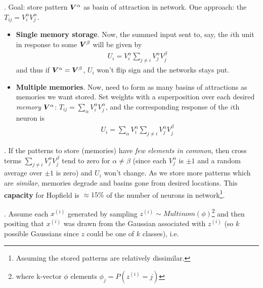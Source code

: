 \documentclass[12pt]{article}
\begin{document}
\p {}. Goal: store pattern $\bm{V}_{}^\alpha$ as basin of attraction in network. One approach: the  $T_{ij} = V_i^\alpha V_j^\alpha$.
\begin{itemize}[$\rightarrow$]
	\item \textbf{Single memory storage}. Now, the summed input sent to, say, the $i$th unit in response to some  $\bm{V}_{}^\beta$ will be given by 
	\begin{align}
		U_i = V_i^\alpha \sum_{j \ne i} V_j^\alpha V_j^\beta 
	\end{align}
	and thus if  $\bm{V}_{}^\alpha = \bm{V}_{}^\beta$, $U_i$ won't flip sign and the networks stays put.
	
	\item \textbf{Multiple memories}. Now, need to form as many basins of attractions as memories we want stored. Set weights with a superposition over each desired \textit{memory} $\bm{V}_{}^\alpha$: $T_{ij} = \sum_\alpha V_i^\alpha V_j^\alpha$, and the corresponding response of the $i$th neuron is
	\begin{align}
		U_i = \sum_\alpha V_i^\alpha \sum_{j \ne i} V_j^\alpha V_j^\beta \label{18}
	\end{align}
\end{itemize}

\p {}. If the patterns to store (memories) have \textit{few elements in common}, then cross terms $\sum_{j\ne i}  V_j^\alpha V_j^\beta$ tend to zero for $\alpha \ne \beta$ (since each $V_j^\alpha$ is $\pm 1$ and a random average over $\pm 1$ is zero) and $U_i$ won't change. As we store more patterns which are \textit{similar}, memories degrade and basins gone from desired locations. This \textbf{capacity} for Hopfield is $\approx 15\%$ of the number of neurons in network\footnote{Assuming the stored patterns are relatively dissimilar.}.






\p {}. Assume each $x^{(i)}$ generated by sampling $z^(i) \sim Multinom(\phi)$\footnote{where k-vector $\phi$ elements $\phi_j = P(z^{(i)} = j)$} and then positing that $x^{(i)}$ was drawn from the Gaussian associated with $z^{(i)}$ (so $k$ possible Gaussians since $z$ could be one of $k$ classes), i.e. 
\end{document}
